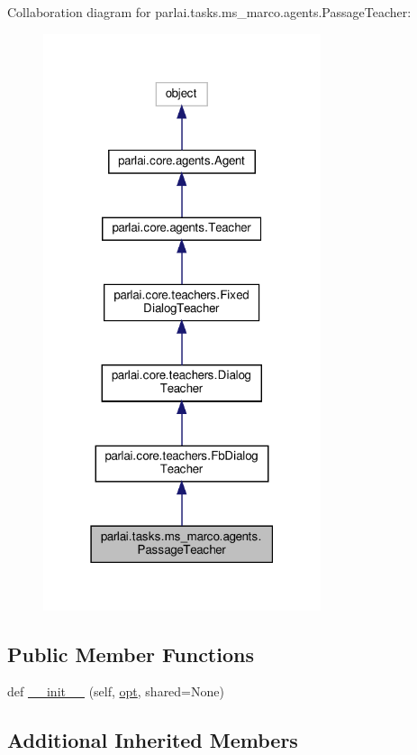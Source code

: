 Collaboration diagram for parlai.\+tasks.\+ms\+\_\+marco.\+agents.\+Passage\+Teacher\+:
\nopagebreak
\begin{figure}[H]
\begin{center}
\leavevmode
\includegraphics[width=231pt]{classparlai_1_1tasks_1_1ms__marco_1_1agents_1_1PassageTeacher__coll__graph}
\end{center}
\end{figure}
\subsection*{Public Member Functions}
\begin{DoxyCompactItemize}
\item 
def \hyperlink{classparlai_1_1tasks_1_1ms__marco_1_1agents_1_1PassageTeacher_a94976bd31fa3b9da0ea1c7625b22c382}{\+\_\+\+\_\+init\+\_\+\+\_\+} (self, \hyperlink{classparlai_1_1core_1_1teachers_1_1FbDialogTeacher_af7a9ec497b9cd0292d7b8fa220da7c28}{opt}, shared=None)
\end{DoxyCompactItemize}
\subsection*{Additional Inherited Members}


